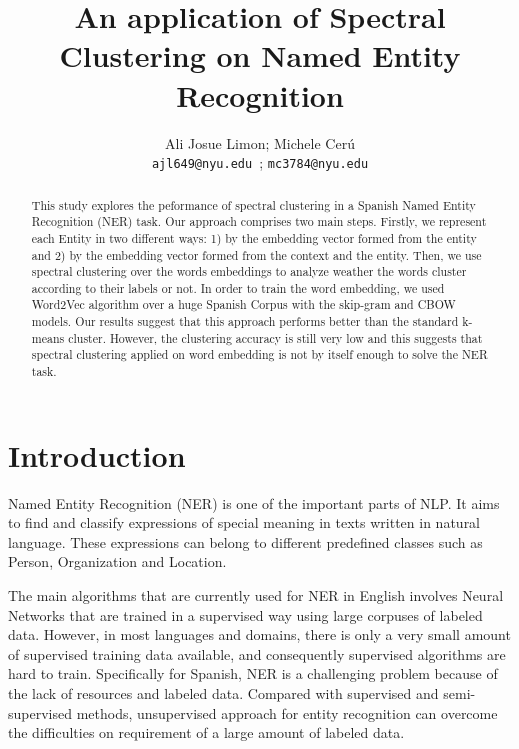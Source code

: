 \documentclass[]{article}
\title{An application of Spectral Clustering on Named Entity Recognition}
\author{Ali Josue Limon; Michele Cer\'u \\ 
	\texttt{ajl649@nyu.edu }; \texttt{mc3784@nyu.edu}
}
\begin{document}
	\maketitle
	\newcommand{\slugmaster}{%
		\slugger{siads}{xxxx}{xx}{x}{x---x}}%
	
	
	
	\begin{abstract}
		This study explores the peformance of spectral clustering in a Spanish Named Entity Recognition (NER) task. Our approach comprises two main steps. Firstly, we represent each Entity in two different ways: 1) by the embedding vector formed from the entity and 2) by the embedding vector formed from the context and the entity.  Then, we use spectral clustering over the words embeddings  to analyze weather the words cluster according to their labels or not.  In order to train the word embedding, we used Word2Vec algorithm over a huge Spanish Corpus with the skip-gram and CBOW models. Our results suggest that this approach performs better than the standard k-means cluster. However, the clustering accuracy is still very low and this suggests that spectral clustering applied on word embedding is not by itself enough to solve the NER task. 
		
	\end{abstract}
	
	\section{Introduction}
	
	Named Entity Recognition (NER) is one of the important parts of NLP. It aims to find and classify expressions of special meaning in texts written in natural language.  These expressions can belong to different predefined classes such as Person, Organization and Location. 
	
	The main algorithms that are currently used for NER in English involves Neural Networks that are trained in a supervised way using large corpuses of labeled data. However, in most languages and domains, there is only a very small amount of supervised training data available, and consequently supervised algorithms are hard to train. Specifically for Spanish, NER is a challenging problem because of the lack of resources and labeled data. Compared with supervised and semi-supervised methods, unsupervised approach for entity recognition can overcome the difficulties on requirement of a large amount of labeled data. 
	
\end{document}
